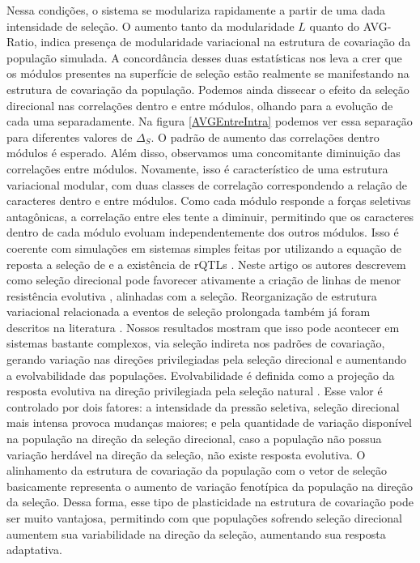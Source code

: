 Nessa condições, o sistema se modulariza rapidamente a partir de uma dada
intensidade de seleção.
O aumento tanto da modularidade $L$ quanto do AVG-Ratio, indica presença
de modularidade variacional na estrutura de covariação da população
simulada.
A concordância desses duas estatísticas nos leva a crer que os módulos
presentes na superfície de seleção estão realmente se manifestando na
estrutura de covariação da população.
Podemos ainda dissecar o efeito da seleção direcional nas correlações
dentro e entre módulos, olhando para a evolução de cada uma
separadamente. 
Na figura \ref{AVGEntreIntra} podemos ver essa separação para diferentes
valores de $\Delta_S$. 
O padrão de aumento das correlações dentro módulos é esperado. 
Além disso, observamos uma concomitante diminuição das correlações entre
módulos. 
Novamente, isso é característico de uma estrutura variacional modular,
com duas classes de correlação correspondendo a relação de caracteres
dentro e entre módulos.
Como cada módulo responde a forças seletivas antagônicas, a correlação
entre eles tente a diminuir, permitindo que os caracteres dentro de cada
módulo evoluam independentemente dos outros módulos. 
Isso é coerente com simulações em sistemas simples feitas por
\cite{Pavlicev2010} utilizando a equação
de reposta a seleção de \cite{Lande1979} e a existência de rQTLs
\citep{Pavlicev2008a}. 
Neste artigo os autores descrevem como seleção direcional pode favorecer
ativamente a criação de linhas de menor resistência evolutiva
\citep[direções do espaço morfológico ricas em
variação, veja][]{Schluter1996},  alinhadas com a seleção. 
Reorganização de estrutura variacional relacionada a eventos de seleção
prolongada também já foram descritos na literatura \citep{Berg1960,
Young2005, Young2010}. 
Nossos resultados mostram que isso pode acontecer em sistemas
bastante complexos, via seleção indireta nos padrões de
covariação, gerando variação nas direções privilegiadas pela seleção
direcional e aumentando a evolvabilidade das populações. 
Evolvabilidade é definida como a projeção da resposta evolutiva na
direção privilegiada pela seleção natural \citep{Hansen2008}.
Esse valor é controlado por dois fatores: a intensidade da pressão
seletiva, seleção direcional mais intensa provoca mudanças maiores; e
pela quantidade de variação disponível na população na direção da
seleção direcional, caso a população não possua variação herdável na
direção da seleção, não existe resposta evolutiva.
O alinhamento da estrutura de covariação da população com o vetor de
seleção basicamente representa o aumento de variação fenotípica da
população na direção da seleção.
Dessa forma, esse tipo de plasticidade na estrutura de covariação pode
ser muito vantajosa, permitindo com que populações sofrendo seleção
direcional aumentem sua variabilidade na direção da seleção, aumentando
sua resposta adaptativa.

